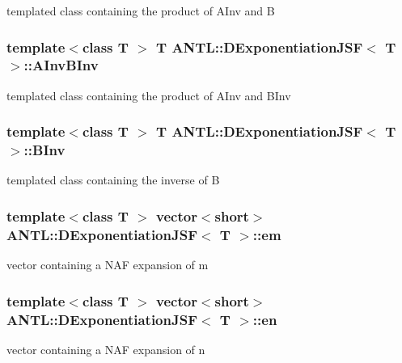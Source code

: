 templated class containing the product of A\-Inv and B \hypertarget{classANTL_1_1DExponentiationJSF_ab93d0817494fa5b21b96b2b7bf7e6870}{
\subsubsection[{A\-Inv\-B\-Inv}]{\setlength{\rightskip}{0pt plus 5cm}template$<$class T $>$ T {\bf A\-N\-T\-L\-::\-D\-Exponentiation\-J\-S\-F}$<$ T $>$\-::A\-Inv\-B\-Inv\hspace{0.3cm}{\ttfamily [protected]}}}\label{classANTL_1_1DExponentiationJSF_ab93d0817494fa5b21b96b2b7bf7e6870}
templated class containing the product of A\-Inv and B\-Inv \hypertarget{classANTL_1_1DExponentiationJSF_afe3234f9976953b1c3484d680e8a6799}{
\subsubsection[{B\-Inv}]{\setlength{\rightskip}{0pt plus 5cm}template$<$class T $>$ T {\bf A\-N\-T\-L\-::\-D\-Exponentiation\-J\-S\-F}$<$ T $>$\-::B\-Inv\hspace{0.3cm}{\ttfamily [protected]}}}\label{classANTL_1_1DExponentiationJSF_afe3234f9976953b1c3484d680e8a6799}
templated class containing the inverse of B \hypertarget{classANTL_1_1DExponentiationJSF_a5d89a984840cab1ed1308e3c39ae6896}{
\subsubsection[{em}]{\setlength{\rightskip}{0pt plus 5cm}template$<$class T $>$ vector$<$short$>$ {\bf A\-N\-T\-L\-::\-D\-Exponentiation\-J\-S\-F}$<$ T $>$\-::em\hspace{0.3cm}{\ttfamily [protected]}}}\label{classANTL_1_1DExponentiationJSF_a5d89a984840cab1ed1308e3c39ae6896}
vector containing a N\-A\-F expansion of m \hypertarget{classANTL_1_1DExponentiationJSF_af7f5f0fc2cc41ee18f988b430930fec4}{
\subsubsection[{en}]{\setlength{\rightskip}{0pt plus 5cm}template$<$class T $>$ vector$<$short$>$ {\bf A\-N\-T\-L\-::\-D\-Exponentiation\-J\-S\-F}$<$ T $>$\-::en\hspace{0.3cm}{\ttfamily [protected]}}}\label{classANTL_1_1DExponentiationJSF_af7f5f0fc2cc41ee18f988b430930fec4}
vector containing a N\-A\-F expansion of n 

